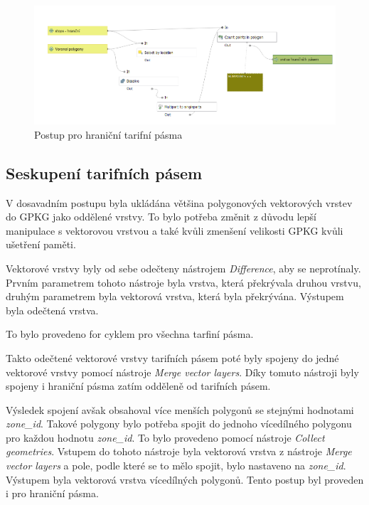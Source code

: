 \begin{figure}[H] \centering
    \includegraphics[width=400pt]{./pictures/postup-border-zones.png}
    \caption[Postup pro hraniční tarifní pásma]{Postup pro hraniční tarifní pásma}
	\label{fig:postup-border-zones}              
\end{figure}

\subsection{Seskupení tarifních pásem}

V dosavadním postupu byla ukládána většina polygonových vektorových vrstev do GPKG jako oddělené vrstvy.
To bylo potřeba změnit z důvodu lepší manipulace s vektorovou vrstvou a také kvůli zmenšení velikosti GPKG
kvůli ušetření paměti.

Vektorové vrstvy byly od sebe odečteny nástrojem \textit{Difference}, aby se neprotínaly. 
Prvním parametrem tohoto nástroje byla vrstva, která překrývala druhou vrstvu, 
druhým parametrem byla vektorová vrstva, která byla překrývána. Výstupem byla odečtená vrstva.

To bylo provedeno for cyklem pro všechna tarfiní pásma.

Takto odečtené vektorové vrstvy tarifních pásem poté byly spojeny do jedné vektorové vrstvy pomocí 
nástroje \textit{Merge vector layers}. Díky tomuto nástroji byly spojeny i hraniční pásma zatím odděleně od tarifních pásem.

Výsledek spojení avšak obsahoval více menších polygonů se stejnými hodnotami \textit{zone\_id}.
Takové polygony bylo potřeba spojit do jednoho vícedílného polygonu pro každou hodnotu \textit{zone\_id}.
To bylo provedeno pomocí nástroje \textit{Collect geometries}. Vstupem do tohoto nástroje byla vektorová vrstva z 
nástroje \textit{Merge vector layers} a pole, podle které se to mělo spojit, bylo nastaveno na \textit{zone\_id}.
Výstupem byla vektorová vrstva vícedílných polygonů. Tento postup byl proveden i pro hraniční pásma.

